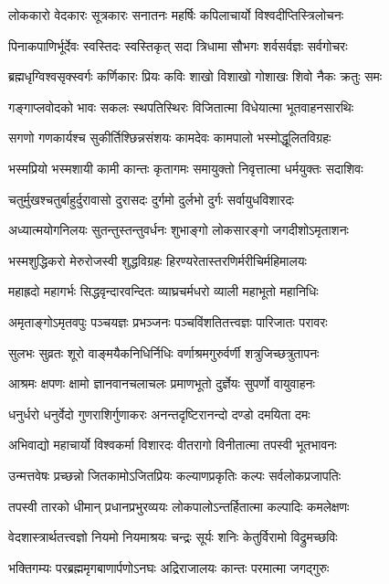 \twolineshloka
{लोककारो वेदकारः सूत्रकारः सनातनः}
{महर्षिः कपिलाचार्यो विश्वदीप्तिस्त्रिलोचनः}

\twolineshloka
{पिनाकपाणिर्भूर्देवः स्वस्तिदः स्वस्तिकृत् सदा}
{त्रिधामा सौभगः शर्वसर्वज्ञः सर्वगोचरः}

\twolineshloka
{ब्रह्मधृग्विश्वसृक्स्वर्गः कर्णिकारः प्रियः कविः}
{शाखो विशाखो गोशाखः शिवो नैकः क्रतुः समः}

\twolineshloka
{गङ्गाप्लवोदको भावः सकलः स्थपतिस्थिरः}
{विजितात्मा विधेयात्मा भूतवाहनसारथिः}

\twolineshloka
{सगणो गणकार्यश्च सुकीर्तिश्छिन्नसंशयः}
{कामदेवः कामपालो भस्मोद्धूलितविग्रहः}

\twolineshloka
{भस्मप्रियो भस्मशायी कामी कान्तः कृतागमः}
{समायुक्तो निवृत्तात्मा धर्मयुक्तः सदाशिवः}

\twolineshloka
{चतुर्मुखश्चतुर्बाहुर्दुरावासो दुरासदः}
{दुर्गमो दुर्लभो दुर्गः सर्वायुधविशारदः}

\twolineshloka
{अध्यात्मयोगनिलयः सुतन्तुस्तन्तुवर्धनः}
{शुभाङ्गो लोकसारङ्गो जगदीशोऽमृताशनः}

\twolineshloka
{भस्मशुद्धिकरो मेरुरोजस्वी शुद्धविग्रहः}
{हिरण्यरेतास्तरणिर्मरीचिर्महिमालयः}

\twolineshloka
{महाह्रदो महागर्भः सिद्धवृन्दारवन्दितः}
{व्याघ्रचर्मधरो व्याली महाभूतो महानिधिः}

\twolineshloka
{अमृताङ्गोऽमृतवपुः पञ्चयज्ञः प्रभञ्जनः}
{पञ्चविंशतितत्त्वज्ञः पारिजातः परावरः}

\twolineshloka
{सुलभः सुव्रतः शूरो वाङ्मयैकनिधिर्निधिः}
{वर्णाश्रमगुरुर्वर्णी शत्रुजिच्छत्रुतापनः}

\twolineshloka
{आश्रमः क्षपणः क्षामो ज्ञानवानचलाचलः}
{प्रमाणभूतो दुर्ज्ञेयः सुपर्णो वायुवाहनः}

\twolineshloka
{धनुर्धरो धनुर्वेदो गुणराशिर्गुणाकरः}
{अनन्तदृष्टिरानन्दो दण्डो दमयिता दमः}

\twolineshloka
{अभिवाद्यो महाचार्यो विश्वकर्मा विशारदः}
{वीतरागो विनीतात्मा तपस्वी भूतभावनः}

\twolineshloka
{उन्मत्तवेषः प्रच्छन्नो जितकामोऽजितप्रियः}
{कल्याणप्रकृतिः कल्पः सर्वलोकप्रजापतिः}

\twolineshloka
{तपस्वी तारको धीमान् प्रधानप्रभुरव्ययः}
{लोकपालोऽन्तर्हितात्मा कल्पादिः कमलेक्षणः}

\twolineshloka
{वेदशास्त्रार्थतत्त्वज्ञो नियमो नियमाश्रयः}
{चन्द्रः सूर्यः शनिः केतुर्विरामो विद्रुमच्छविः}

\twolineshloka
{भक्तिगम्यः परब्रह्ममृगबाणार्पणोऽनघः}
{अद्रिराजालयः कान्तः परमात्मा जगद्गुरुः}


